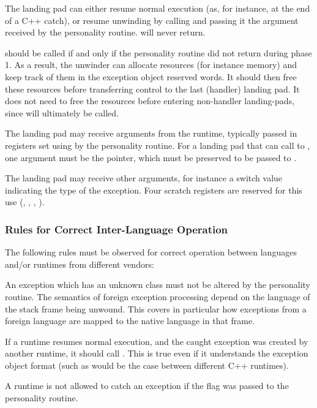 The landing pad can either resume normal execution (as, for instance, at
the end of a C++ catch), or resume unwinding by calling  and
passing it the  argument received by the personality routine.
 will never return.

 should be called if and only if the personality routine
did not return  during phase 1.  As a result,
the unwinder can allocate resources (for instance memory) and keep track
of them in the exception object reserved words. It should then free these
resources before transferring control to the last (handler) landing pad.
It does not need to free the resources before entering non-handler
landing-pads, since  will ultimately be called.

The landing pad may receive arguments from the runtime, typically passed
in registers set using  by the personality routine.
For a landing pad that can call to , one argument must
be the  pointer, which must be preserved to be passed to
.

The landing pad may receive other arguments, for instance a switch value
indicating the type of the exception. Four scratch registers are reserved
for this use (\RDI, \RSI, \RDX, \RCX).

\subsubsection{Rules for Correct Inter-Language Operation}

The following rules must be observed for correct operation between
languages and/or runtimes from different vendors:

An exception which has an unknown class must not be altered by the
personality routine. The semantics of foreign exception processing
depend on the language of the stack frame being unwound. This covers
in particular how exceptions from a foreign language are mapped to
the native language in that frame.

If a runtime resumes normal execution, and the caught exception was
created by another runtime, it should call .
This is true even if it understands the exception object format
(such as would be the case between different C++ runtimes).

A runtime is not allowed to catch an exception if the
 flag was passed to the personality routine.

